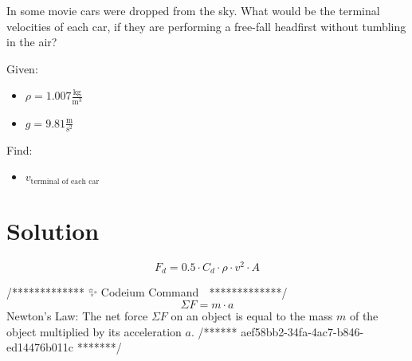 
In some movie cars were dropped from the sky.
What would be the terminal velocities of each car, if they are
performing a free-fall headfirst without tumbling in the air?

\bigbreak Given:
\begin{itemize}
    \item $ \rho = 1.007 \frac{\text{kg}}{\text{m}^3} $
    \item $ g = 9.81 \frac{\text{m}}{\text{s}^2} $
\end{itemize}

Find:
\begin{itemize}
    \item $ v_{\text{terminal of each car}} $
\end{itemize}


\section*{Solution}

$$F_d = 0.5 \cdot C_d \cdot \rho \cdot v^2 \cdot A$$

/*************  ✨ Codeium Command 🌟  *************/
$$ \Sigma F = m \cdot a $$
 Newton's Law: The net force $\Sigma F$ on an object is equal to the mass $m$ of the object multiplied by its acceleration $a$.
/******  aef58bb2-34fa-4ac7-b846-ed14476b011c  *******/

